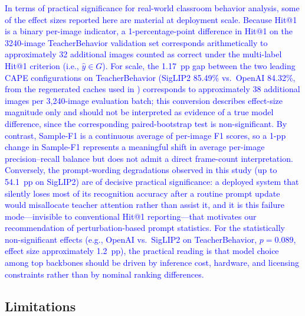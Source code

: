 \documentclass[symmetry,article,submit,pdftex,moreauthors]{Definitions/mdpi}
\newcommand{\rev}[1]{\textcolor{blue}{#1}}
\begin{document}
\rev{In terms of practical significance for real-world classroom behavior analysis, some of the effect sizes reported here are material at deployment scale. Because Hit@1 is a binary per-image indicator, a 1-percentage-point difference in Hit@1 on the 3240-image TeacherBehavior validation set corresponds arithmetically to approximately 32 additional images counted as correct under the multi-label Hit@1 criterion (i.e., $\hat y\in G$). For scale, the 1.17~pp gap between the two leading CAPE configurations on TeacherBehavior (SigLIP2 85.49\% vs.\ OpenAI 84.32\%, from the regenerated caches used in \Cref{tab:paired_bootstrap_full}) corresponds to approximately 38 additional images per 3,240-image evaluation batch; this conversion describes effect-size magnitude only and should not be interpreted as evidence of a true model difference, since the corresponding paired-bootstrap test is non-significant. By contrast, Sample-F1 is a continuous average of per-image F1 scores, so a 1-pp change in Sample-F1 represents a meaningful shift in average per-image precision--recall balance but does not admit a direct frame-count interpretation. Conversely, the prompt-wording degradations observed in this study (up to 54.1~pp on SigLIP2) are of decisive practical significance: a deployed system that silently loses most of its recognition accuracy after a routine prompt update would misallocate teacher attention rather than assist it, and it is this failure mode---invisible to conventional Hit@1 reporting---that motivates our recommendation of perturbation-based prompt statistics. For the statistically non-significant effects (e.g., OpenAI vs.\ SigLIP2 on TeacherBehavior, $p=0.089$, effect size approximately 1.2~pp), the practical reading is that model choice among top backbones should be driven by inference cost, hardware, and licensing constraints rather than by nominal ranking differences.}

\subsection{Limitations}
\end{document}
